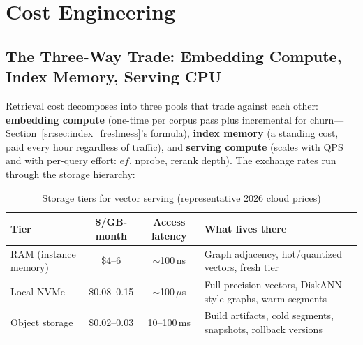 \section{Cost Engineering}
\label{sr:sec:cost_engineering}

\subsection{The Three-Way Trade: Embedding Compute, Index Memory, Serving CPU}

Retrieval cost decomposes into three pools that trade against each other: \textbf{embedding compute} (one-time per corpus pass plus incremental for churn---Section~\ref{sr:sec:index_freshness}'s formula), \textbf{index memory} (a standing cost, paid every hour regardless of traffic), and \textbf{serving compute} (scales with QPS and with per-query effort: $ef$, nprobe, rerank depth). The exchange rates run through the storage hierarchy:

\begin{table}[H]
\centering
\small
\caption{Storage tiers for vector serving (representative 2026 cloud prices)}
\label{sr:tab:storage_tiers}
\begin{tabularx}{\textwidth}{lccX}
\toprule
\textbf{Tier} & \textbf{\$/GB-month} & \textbf{Access latency} & \textbf{What lives there} \\
\midrule
RAM (instance memory) & \$4--6 & $\sim$100\,ns & Graph adjacency, hot/quantized vectors, fresh tier \\
Local NVMe & \$0.08--0.15 & $\sim$100\,$\mu$s & Full-precision vectors, DiskANN-style graphs, warm segments \\
Object storage & \$0.02--0.03 & 10--100\,ms & Build artifacts, cold segments, snapshots, rollback versions \\
\bottomrule
\end{tabularx}
\end{table}

